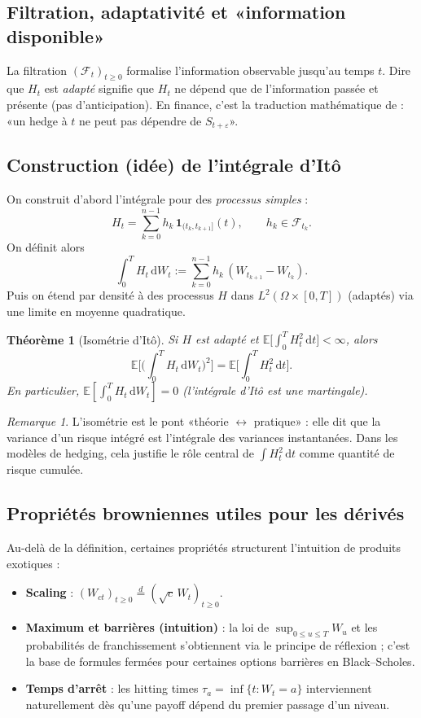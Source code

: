 \documentclass[11pt,a4paper]{report}
\theoremstyle{definition}
\theoremstyle{plain}
\newtheorem{theorem}{Théorème}[chapter]
\theoremstyle{remark}
\newtheorem{remark}{Remarque}[chapter]
\newcommand{\dd}{\mathrm{d}}
\newcommand{\E}{\mathbb{E}}
\newcommand{\1}{\mathbf{1}}
\newcommand{\F}{\mathcal{F}}
\begin{document}
\subsection*{Filtration, adaptativité et «information disponible»}
La filtration $(\F_t)_{t\ge 0}$ formalise l'information observable jusqu'au temps $t$.
Dire que $H_t$ est \emph{adapté} signifie que $H_t$ ne dépend que de l'information passée et présente (pas d'anticipation).
En finance, c'est la traduction mathématique de : «un hedge à $t$ ne peut pas dépendre de $S_{t+\varepsilon}$».

\subsection*{Construction (idée) de l'intégrale d'Itô}
On construit d'abord l'intégrale pour des \emph{processus simples} :
\[
H_t = \sum_{k=0}^{n-1} h_k\,\1_{(t_k,t_{k+1}]}(t),\qquad h_k\in\F_{t_k}.
\]
On définit alors
\[
\int_0^T H_t\,\dd W_t := \sum_{k=0}^{n-1} h_k\,(W_{t_{k+1}}-W_{t_k}).
\]
Puis on étend par densité à des processus $H$ dans $L^2(\Omega\times[0,T])$ (adaptés) via une limite en moyenne quadratique.

\begin{theorem}[Isométrie d'Itô]
Si $H$ est adapté et $\E\big[\int_0^T H_t^2\,\dd t\big]<\infty$, alors
\[
\E\Big[\Big(\int_0^T H_t\,\dd W_t\Big)^2\Big] = \E\Big[\int_0^T H_t^2\,\dd t\Big].
\]
En particulier, $\E[\int_0^T H_t\,\dd W_t]=0$ (l'intégrale d'Itô est une martingale).
\end{theorem}

\begin{remark}
L'isométrie est le pont «théorie $\leftrightarrow$ pratique» : elle dit que la variance d'un risque intégré est l'intégrale des variances instantanées.
Dans les modèles de hedging, cela justifie le rôle central de $\int H_t^2\,\dd t$ comme quantité de risque cumulée.
\end{remark}

\subsection*{Propriétés browniennes utiles pour les dérivés}
Au-delà de la définition, certaines propriétés structurent l'intuition de produits exotiques :
\begin{itemize}[leftmargin=*]
\item \textbf{Scaling} : $(W_{ct})_{t\ge 0}\overset{d}{=}(\sqrt{c}\,W_t)_{t\ge 0}$.
\item \textbf{Maximum et barrières (intuition)} : la loi de $\sup_{0\le u\le T} W_u$ et les probabilités de franchissement s'obtiennent via le principe de réflexion ; c'est la base de formules fermées pour certaines options barrières en Black--Scholes.
\item \textbf{Temps d'arrêt} : les hitting times $\tau_a=\inf\{t:W_t=a\}$ interviennent naturellement dès qu'une payoff dépend du premier passage d'un niveau.
\end{itemize}
\end{document}
